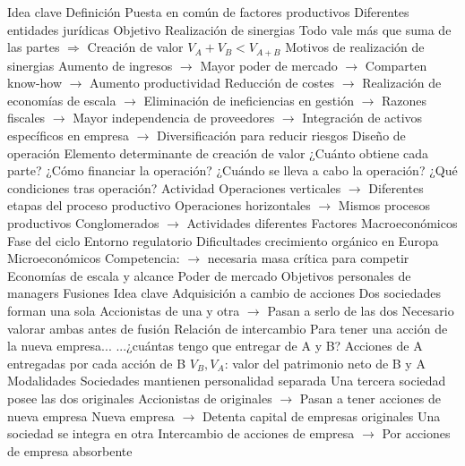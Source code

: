 \documentclass{nuevotema}
\begin{document}
\begin{esquemal}
	\1 
		\2 Idea clave
			\3 Definición
				\4 Puesta en común de factores productivos
				\4 Diferentes entidades jurídicas
			\3 Objetivo
				\4 Realización de sinergias
				\4 Todo vale más que suma de las partes
				\4[] $\Rightarrow$ Creación de valor
				\4 $V_A + V_B < V_{A+B}$
				\4 Motivos de realización de sinergias
				\4[] Aumento de ingresos
				\4[] $\to$ Mayor poder de mercado
				\4[] $\to$ Comparten know-how
				\4[] $\to$ Aumento productividad
				\4 Reducción de costes
				\4[] $\to$ Realización de economías de escala
				\4[] $\to$ Eliminación de ineficiencias en gestión
				\4[] $\to$ Razones fiscales
				\4[] $\to$ Mayor independencia de proveedores
				\4[] $\to$ Integración de activos específicos en empresa
				\4[] $\to$ Diversificación para reducir riesgos
			\3 Diseño de operación
				\4 Elemento determinante de creación de valor
				\4[] ¿Cuánto obtiene cada parte?
				\4[] ¿Cómo financiar la operación?
				\4[] ¿Cuándo se lleva a cabo la operación?
				\4[] ¿Qué condiciones tras operación?
				\4 Actividad
				\4[] Operaciones verticales
				\4[] $\to$ Diferentes etapas del proceso productivo
				\4[] Operaciones horizontales
				\4[] $\to$ Mismos procesos productivos
				\4[] Conglomerados
				\4[] $\to$ Actividades diferentes
			\3 Factores
				\4 Macroeconómicos
				\4[] Fase del ciclo
				\4[] Entorno regulatorio
				\4 Dificultades crecimiento orgánico en Europa
				\4 Microeconómicos
				\4[] Competencia:
				\4[] $\to$ necesaria masa crítica para competir
				\4[] Economías de escala y alcance
				\4[] Poder de mercado
				\4[] Objetivos personales de managers
		\2 Fusiones
			\3 Idea clave
				\4 Adquisición a cambio de acciones
				\4[] Dos sociedades forman una sola
				\4[] Accionistas de una y otra
				\4[] $\to$ Pasan a serlo de las dos
				\4 Necesario valorar ambas antes de fusión
			\3 Relación de intercambio
				\4 Para tener una acción de la nueva empresa...
				\4[] ...¿cuántas tengo que entregar de A y B?
				\4[] 
				\4[] Acciones de A entregadas por cada acción de B
				\4[] $V_B, V_A$: valor del patrimonio neto de B y A
			\3 Modalidades
				\4 Sociedades mantienen personalidad separada
				\4[] Una tercera sociedad posee las dos originales
				\4[] Accionistas de originales
				\4[] $\to$ Pasan a tener acciones de nueva empresa
				\4[] Nueva empresa
				\4[] $\to$ Detenta capital de empresas originales
				\4 Una sociedad se integra en otra
				\4[] Intercambio de acciones de empresa
				\4[] $\to$ Por acciones de empresa absorbente

\end{esquemal}
\end{document}
